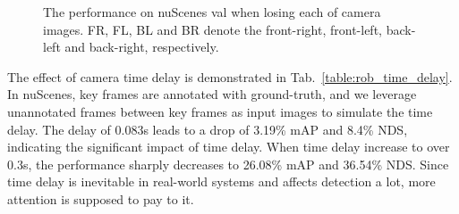 \documentclass[10pt,twocolumn,letterpaper]{article}
\begin{document}
\begin{figure}[h]
  \caption{The performance on nuScenes val when losing each of camera images. FR, FL, BL and BR denote the front-right, front-left, back-left and back-right, respectively.}
  \label{fig:ab_cam_miss}
\end{figure}

The effect of camera time delay is demonstrated in Tab.~\ref{table:rob_time_delay}. In nuScenes, key frames are annotated with ground-truth, and we leverage unannotated frames between key frames as input images to simulate the time delay. 
The delay of 0.083s leads to a drop of 3.19\% mAP and 8.4\% NDS, indicating the significant impact of time delay. When time delay increase to over 0.3s, the performance sharply decreases to 26.08\% mAP and 36.54\% NDS.
Since time delay is inevitable in real-world systems and affects detection a lot, more attention is supposed to pay to it.

\begin{table}[h]
    \caption{The performance impact (on mAP metric) of camera time delay. Here, the time delay unit $T \approx 0.083$s.}
    \label{table:rob_time_delay}
\end{table}
\end{document}
